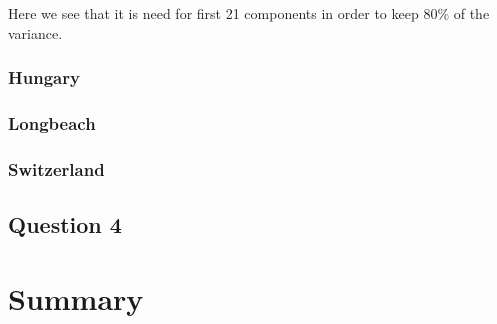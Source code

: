 \documentclass[a4paper]{article}
\begin{document}
Here we see that it is need for first 21 components in order to keep $80\%$ of the variance. 

\subsubsection{Hungary}

\subsubsection{Longbeach}

\subsubsection{Switzerland}

\subsection{Question 4}

\section{Summary}
\end{document}
